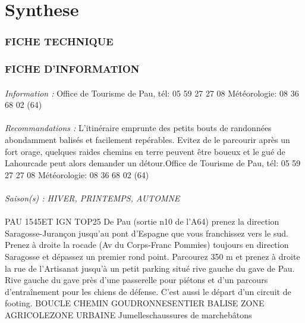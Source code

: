\documentclass{article}
\begin{document}
        \section{Synthese}
        
        \subsubsection{FICHE TECHNIQUE}
    
        \subsubsection{FICHE D'INFORMATION}
    
        \paragraph{}
        \emph{Information : }
        Office de Tourisme de Pau, tél: 05 59 27 27 08 Météorologie: 08 36 68 02 (64)
        \paragraph{}
        \emph{Recommandations : }
        L'itinéraire emprunte des petits bouts de randonnées abondamment balisés et facilement repérables. Evitez de le parcourir après un fort orage, quelques raides chemins en terre peuvent être boueux et le gué de Lahourcade peut alors demander un détour.Office de Tourisme de Pau, tél: 05 59 27 27 08 Météorologie: 08 36 68 02 (64)
        \paragraph{}
        \emph{Saison(s) : HIVER, PRINTEMPS, AUTOMNE}\\~\\

                    PAU
                    1545ET 
                    IGN TOP25 
                    De Pau (sortie n10 de l'A64) prenez la direction Saragosse-Jurançon jusqu'au pont d'Espagne que vous franchissez vers le sud. Prenez à droite la rocade (Av du Corps-Franc Pommies) toujours en direction Saragosse et dépassez un premier rond point. Parcourez 350 m et prenez à droite la rue de l'Artisanat jusqu'à un petit parking situé rive gauche du gave de Pau.
                    Rive gauche du gave près d'une passerelle pour piétons et d'un parcours d'entraînement pour les chiens de défense. C'est aussi le départ d'un circuit de footing.
                    BOUCLE 
                    CHEMIN GOUDRONNESENTIER BALISE
                    ZONE AGRICOLEZONE URBAINE
                    Jumelleschaussures de marchebâtons
                
\end{document}
